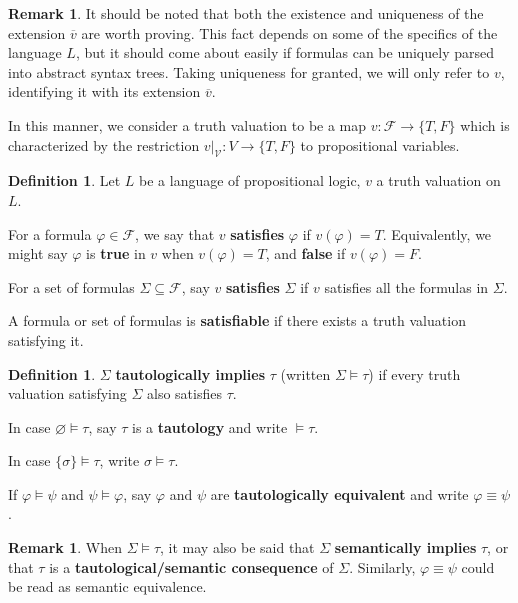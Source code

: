 \documentclass[12pt]{article}
\theoremstyle{definition}
\newtheorem{definition}[theorem]{Definition}
\newtheorem{remark}[theorem]{Remark}
\renewcommand{\phi}{\varphi}
\renewcommand{\emptyset}{\varnothing}
\newcommand{\<}{\langle}
\renewcommand{\>}{\rangle}
\newcommand{\clo}{\overline}
\newcommand{\seq}{\subseteq}
\newcommand{\FF}{\mathcal{F}}
\newcommand{\VV}{\mathcal{V}}
\newcommand{\keyword}{\textbf}
\begin{document}
\begin{remark}
    It should be noted that both the existence and uniqueness of the extension $\clo{v}$ are worth proving.
    This fact depends on some of the specifics of the language $L$, but it should come about easily if formulas can be uniquely parsed into abstract syntax trees.
    Taking uniqueness for granted, we will only refer to $v$, identifying it with its extension $\clo{v}$.

    In this manner, we consider a truth valuation to be a map $v : \FF \to \{T, F\}$ which is characterized by the restriction $v|_\VV : V \to \{T, F\}$ to propositional variables.
\end{remark}

\begin{definition}
    Let $L$ be a language of propositional logic, $v$ a truth valuation on $L$.
    
    For a formula $\phi \in \FF$, we say that $v$ \keyword{satisfies} $\phi$ if $v(\phi) = T$.
    Equivalently, we might say $\phi$ is \keyword{true} in $v$ when $v(\phi) = T$, and \keyword{false} if $v(\phi) = F$.

    For a set of formulas $\Sigma \seq \FF$, say $v$ \keyword{satisfies} $\Sigma$ if $v$ satisfies all the formulas in $\Sigma$.

    A formula or set of formulas is \keyword{satisfiable} if there exists a truth valuation satisfying it.
\end{definition}

\begin{definition}
    $\Sigma$ \keyword{tautologically implies} $\tau$ (written $\Sigma \vDash \tau$) if every truth valuation satisfying $\Sigma$ also satisfies $\tau$.

    In case $\emptyset \vDash \tau$, say $\tau$ is a \keyword{tautology} and write $\vDash \tau$.

    In case $\{\sigma\} \vDash \tau$, write $\sigma \vDash \tau$.

    If $\phi \vDash \psi$ and $\psi \vDash \phi$, say $\phi$ and $\psi$ are \keyword{tautologically equivalent} and write $\phi \equiv \psi$.
\end{definition}

\begin{remark}
    When $\Sigma \vDash \tau$, it may also be said that $\Sigma$ \keyword{semantically implies} $\tau$, or that $\tau$ is a \keyword{tautological/semantic consequence} of $\Sigma$.
    Similarly, $\phi \equiv \psi$ could be read as semantic equivalence.
\end{remark}
\end{document}
